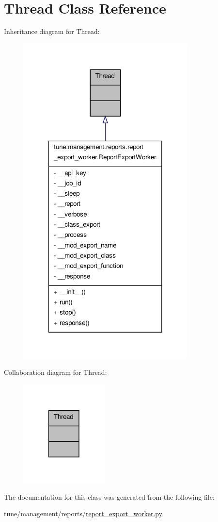 \hypertarget{classThread}{\section{Thread Class Reference}
\label{classThread}
}


Inheritance diagram for Thread\-:
\nopagebreak
\begin{figure}[H]
\begin{center}
\leavevmode
\includegraphics[width=254pt]{classThread__inherit__graph}
\end{center}
\end{figure}


Collaboration diagram for Thread\-:
\nopagebreak
\begin{figure}[H]
\begin{center}
\leavevmode
\includegraphics[width=126pt]{classThread__coll__graph}
\end{center}
\end{figure}


The documentation for this class was generated from the following file\-:\begin{DoxyCompactItemize}
\item 
tune/management/reports/\hyperlink{report__export__worker_8py}{report\-\_\-export\-\_\-worker.\-py}\end{DoxyCompactItemize}
